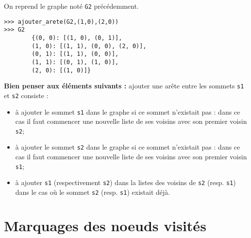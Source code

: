 \begin{exemple}
On reprend le graphe noté \lstinline{G2} précédemment. 
\begin{lstlisting}
>>> ajouter_arete(G2,(1,0),(2,0))
>>> G2
        {(0, 0): [(1, 0), (0, 1)],
        (1, 0): [(1, 1), (0, 0), (2, 0)],
        (0, 1): [(1, 1), (0, 0)],
        (1, 1): [(0, 1), (1, 0)],
        (2, 0): [(1, 0)]}
\end{lstlisting}
\end{exemple}


\textbf{Bien penser aux éléments suivants :} ajouter une arête entre les sommets \lstinline{s1} et \lstinline{s2} consiste :
\begin{itemize}
\item à ajouter le sommet \lstinline{s1} dans le graphe si ce sommet n'existait pas : dans ce cas il faut commencer une nouvelle liste de ses voisins avec son premier voisin \lstinline{s2};
\item à ajouter le sommet \lstinline{s2} dans le graphe si ce sommet n'existait pas : dans ce cas il faut commencer une nouvelle liste de ses voisins avec son premier voisin \lstinline{s1};
\item à ajouter \lstinline{s1} (respectivement \lstinline{s2}) dans la listes des voisins de \lstinline{s2} (resp. \lstinline{s1}) dans le cas où le sommet \lstinline{s2} (resp. \lstinline{s1}) existait déjà.
\end{itemize}


\section*{Marquages des noeuds visités}

